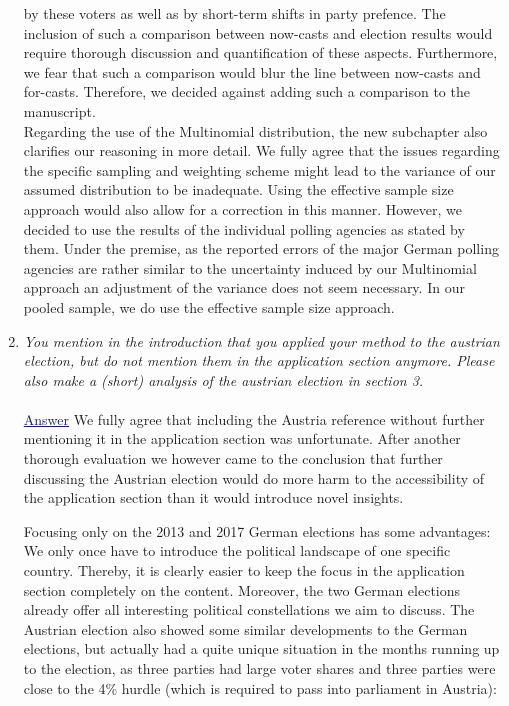 \documentclass{scrartcl}
\newcommand{\blue}[1]{\textcolor{MidnightBlue}{\underline{\textcolor{MidnightBlue}{#1}}}}
\begin{document}
\begin{enumerate}
by these voters as well as by short-term shifts in party prefence.
The inclusion of such a comparison between now-casts and election results would require thorough discussion
and quantification of these aspects. Furthermore, we fear that such a comparison would blur the line between now-casts and for-casts. Therefore, we decided against adding such a comparison to the manuscript.\\
Regarding the use of the Multinomial distribution, the new subchapter also clarifies our reasoning in more detail.
We fully agree that the issues regarding the specific sampling and weighting scheme might lead to the
variance of our assumed distribution to be inadequate.
Using the effective sample size approach would also allow for a correction in this manner.
However, we decided to use the results of the individual polling agencies as stated by them.
Under the premise, as the reported errors of the major German polling agencies are rather similar to the uncertainty
induced by our Multinomial approach an adjustment of the variance does not seem necessary.
In our pooled sample, we do use the effective sample size approach.

  \item \emph{
You mention in the introduction that you applied your method to the austrian election, but do not mention them in the application section anymore. Please also make a (short) analysis of the austrian election in section 3.
}
  \\ \\
  \blue{Answer} We fully agree that including the Austria reference without further mentioning it in the application section was unfortunate. After another thorough evaluation we however came to the conclusion that further discussing the Austrian election would do more harm to the accessibility of the application section than it would introduce novel insights.\

Focusing only on the 2013 and 2017 German elections has some advantages:
We only once have to introduce the political landscape of one specific country.
Thereby, it is clearly easier to keep the focus in the application section completely on the content.
Moreover, the two German elections already offer all interesting political constellations we aim to discuss. The Austrian election also showed some similar developments to the German elections, but actually had a quite unique situation in the months running up to the election, as three parties had large voter shares and three parties were close to the 4\% hurdle (which is required to pass into parliament in Austria):


\end{enumerate}
\end{document}
